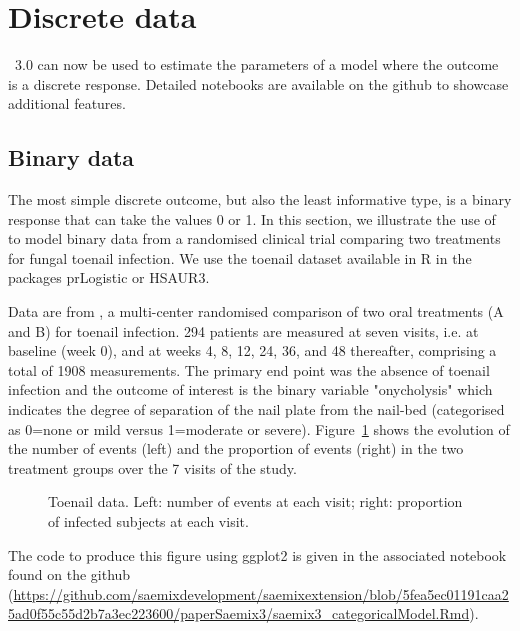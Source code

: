 
\section{Discrete data}

\saemix~3.0 can now be used to estimate the parameters of a model where the outcome is a discrete response. Detailed notebooks are available on the github to showcase additional features.

\subsection{Binary data} \label{sec:toenail}
 
The most simple discrete outcome, but also the least informative type, is a binary response that can take the values 0 or 1. In this section, we illustrate the use of \saemix to model binary data from a randomised clinical trial comparing two treatments for fungal toenail infection. We use the {\sf toenail} dataset available in {\sf R} in the packages {\sf prLogistic} or {\sf HSAUR3}.

Data are from \cite{debacker_toenail}, a multi-center randomised comparison  of two oral treatments (A and B) for toenail infection. 294 patients are measured at seven visits, i.e. at baseline (week 0), and at weeks 4, 8, 12, 24, 36, and 48 thereafter, comprising a total of 1908 measurements. The primary end point was the absence of toenail infection and the outcome of interest is the binary variable "onycholysis" which indicates the degree of separation of the nail plate from the nail-bed (categorised as 0=none or mild versus 1=moderate or severe). Figure~\ref{fig:toenailData} shows the evolution of the number of events (left) and the proportion of events (right) in the two treatment groups over the 7 visits of the study.

\begin{figure}[!h]
\begin{center}
\end{center}
\par \kern -0.5cm
\caption{Toenail data. Left: number of events at each visit; right: proportion of infected subjects at each visit.} \label{fig:toenailData}
\end{figure}

The code to produce this figure using {\sf ggplot2} is given in the associated notebook found on the github (\url{https://github.com/saemixdevelopment/saemixextension/blob/5fea5ec01191caa25ad0f55c55d2b7a3ec223600/paperSaemix3/saemix3_categoricalModel.Rmd}).

